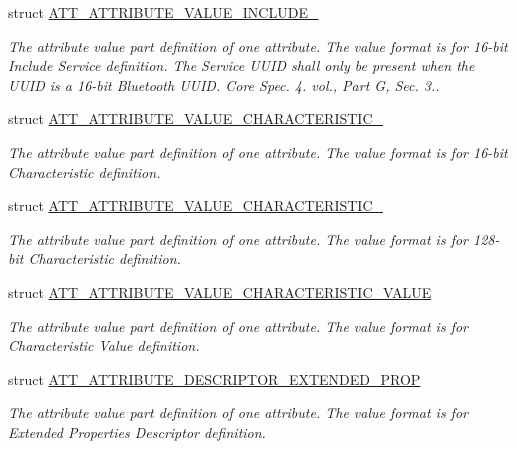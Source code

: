 \begin{DoxyCompactItemize}
struct \hyperlink{struct_a_t_t___a_t_t_r_i_b_u_t_e___v_a_l_u_e___i_n_c_l_u_d_e__2}{A\+T\+T\+\_\+\+A\+T\+T\+R\+I\+B\+U\+T\+E\+\_\+\+V\+A\+L\+U\+E\+\_\+\+I\+N\+C\+L\+U\+D\+E\+\_}
\begin{DoxyCompactList}\small\item\em The attribute value part definition of one attribute. The value format is for 16-\/bit Include Service definition. The Service U\+U\+ID shall only be present when the U\+U\+ID is a 16-\/bit Bluetooth U\+U\+ID. Core Spec. 4. vol., Part G, Sec. 3.. \end{DoxyCompactList}\item 
struct \hyperlink{struct_a_t_t___a_t_t_r_i_b_u_t_e___v_a_l_u_e___c_h_a_r_a_c_t_e_r_i_s_t_i_c__2}{A\+T\+T\+\_\+\+A\+T\+T\+R\+I\+B\+U\+T\+E\+\_\+\+V\+A\+L\+U\+E\+\_\+\+C\+H\+A\+R\+A\+C\+T\+E\+R\+I\+S\+T\+I\+C\+\_}
\begin{DoxyCompactList}\small\item\em The attribute value part definition of one attribute. The value format is for 16-\/bit Characteristic definition. \end{DoxyCompactList}\item 
struct \hyperlink{struct_a_t_t___a_t_t_r_i_b_u_t_e___v_a_l_u_e___c_h_a_r_a_c_t_e_r_i_s_t_i_c__16}{A\+T\+T\+\_\+\+A\+T\+T\+R\+I\+B\+U\+T\+E\+\_\+\+V\+A\+L\+U\+E\+\_\+\+C\+H\+A\+R\+A\+C\+T\+E\+R\+I\+S\+T\+I\+C\+\_}
\begin{DoxyCompactList}\small\item\em The attribute value part definition of one attribute. The value format is for 128-\/bit Characteristic definition. \end{DoxyCompactList}\item 
struct \hyperlink{struct_a_t_t___a_t_t_r_i_b_u_t_e___v_a_l_u_e___c_h_a_r_a_c_t_e_r_i_s_t_i_c___v_a_l_u_e}{A\+T\+T\+\_\+\+A\+T\+T\+R\+I\+B\+U\+T\+E\+\_\+\+V\+A\+L\+U\+E\+\_\+\+C\+H\+A\+R\+A\+C\+T\+E\+R\+I\+S\+T\+I\+C\+\_\+\+V\+A\+L\+UE}
\begin{DoxyCompactList}\small\item\em The attribute value part definition of one attribute. The value format is for Characteristic Value definition. \end{DoxyCompactList}\item 
struct \hyperlink{struct_a_t_t___a_t_t_r_i_b_u_t_e___d_e_s_c_r_i_p_t_o_r___e_x_t_e_n_d_e_d___p_r_o_p}{A\+T\+T\+\_\+\+A\+T\+T\+R\+I\+B\+U\+T\+E\+\_\+\+D\+E\+S\+C\+R\+I\+P\+T\+O\+R\+\_\+\+E\+X\+T\+E\+N\+D\+E\+D\+\_\+\+P\+R\+OP}
\begin{DoxyCompactList}\small\item\em The attribute value part definition of one attribute. The value format is for Extended Properties Descriptor definition. \end{DoxyCompactList}\item 

\end{DoxyCompactItemize}
